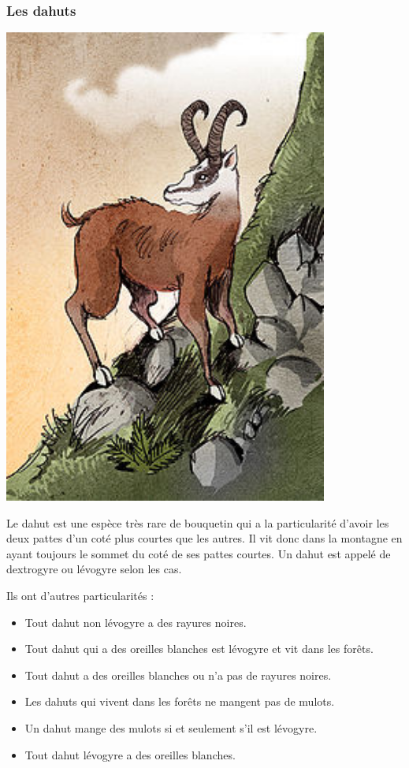 \subsubsection{Les dahuts}
\begin{minipage}[b]{0.36\textwidth}
\includegraphics[width=0.8\textwidth]{dahut}
\end{minipage}
\begin{minipage}[b]{0.64\textwidth}
Le dahut est une espèce très rare de bouquetin qui a la particularité d'avoir les deux pattes d'un coté plus courtes que les autres. Il vit donc dans la montagne en ayant toujours le sommet du coté de ses pattes courtes.
 Un dahut est appelé de dextrogyre ou lévogyre selon les cas.
 
 Ils ont d'autres particularités :
 \begin{itemize}
\item Tout dahut non lévogyre a des rayures noires.
\item Tout dahut qui a des oreilles blanches est lévogyre et vit dans 
les forêts.
\item Tout dahut a des oreilles blanches ou n'a pas de rayures noires.
\item Les dahuts qui vivent dans les forêts ne mangent pas de mulots.
\item Un  dahut mange des mulots si et seulement s'il est lévogyre.
\item Tout dahut lévogyre a des oreilles blanches.
 \end{itemize}
\end{minipage}


